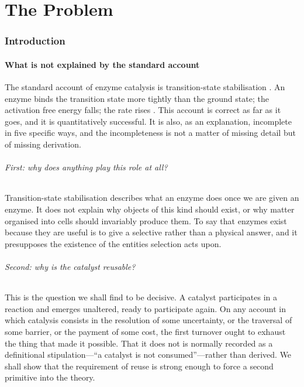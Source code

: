 \documentclass[11pt,twocolumn,a4paper]{article}
\theoremstyle{plain}
\theoremstyle{definition}
\theoremstyle{remark}
\begin{document}
\tableofcontents

\part{The Problem}

\section{Introduction}
\label{sec:introduction}

\subsection{What is not explained by the standard account}
\label{sec:not-explained}

The standard account of enzyme catalysis is transition-state stabilisation
\citep{pauling1946,eyring1935}. An enzyme binds the transition state more
tightly than the ground state; the activation free energy falls; the rate rises
\citep{schramm2011,warshel2006}. This account is correct as far as it goes, and
it is quantitatively successful. It is also, as an explanation, incomplete in
five specific ways, and the incompleteness is not a matter of missing detail but
of missing derivation.

\paragraph{First: why does anything play this role at all?}
Transition-state stabilisation describes what an enzyme does once we are given
an enzyme. It does not explain why objects of this kind should exist, or why
matter organised into cells should invariably produce them. To say that enzymes
exist because they are useful is to give a selective rather than a physical
answer, and it presupposes the existence of the entities selection acts upon.

\paragraph{Second: why is the catalyst reusable?}
This is the question we shall find to be decisive. A catalyst participates in a
reaction and emerges unaltered, ready to participate again. On any account in
which catalysis consists in the resolution of some uncertainty, or the traversal
of some barrier, or the payment of some cost, the first turnover ought to
exhaust the thing that made it possible. That it does not is normally recorded
as a definitional stipulation---``a catalyst is not consumed''---rather than
derived. We shall show that the requirement of reuse is strong enough to force a
second primitive into the theory.
\end{document}
